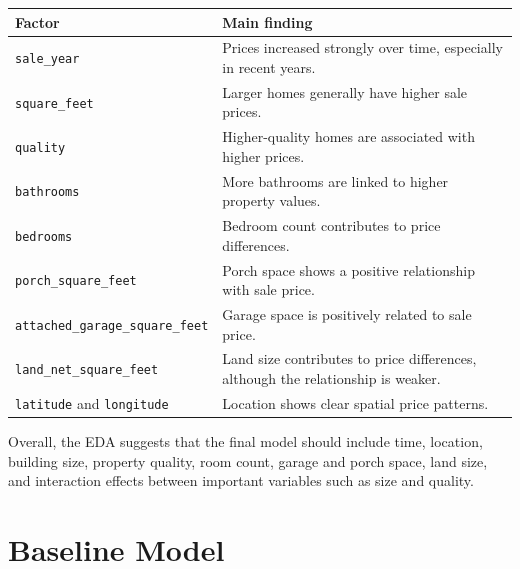 \documentclass[
  english,
  letterpaper,
  DIV=11,
  numbers=noendperiod]{scrreprt}
\begin{document}
\begin{longtable}[]{@{}
  >{\raggedright\arraybackslash}p{}
  >{\raggedright\arraybackslash}p{}@{}}
\toprule\noalign{}
\begin{minipage}[b]{\linewidth}\raggedright
Factor
\end{minipage} & \begin{minipage}[b]{\linewidth}\raggedright
Main finding
\end{minipage} \\
\midrule\noalign{}
\endhead
\bottomrule\noalign{}
\endlastfoot
\texttt{sale\_year} & Prices increased strongly over time, especially in
recent years. \\
\texttt{square\_feet} & Larger homes generally have higher sale
prices. \\
\texttt{quality} & Higher-quality homes are associated with higher
prices. \\
\texttt{bathrooms} & More bathrooms are linked to higher property
values. \\
\texttt{bedrooms} & Bedroom count contributes to price differences. \\
\texttt{porch\_square\_feet} & Porch space shows a positive relationship
with sale price. \\
\texttt{attached\_garage\_square\_feet} & Garage space is positively
related to sale price. \\
\texttt{land\_net\_square\_feet} & Land size contributes to price
differences, although the relationship is weaker. \\
\texttt{latitude} and \texttt{longitude} & Location shows clear spatial
price patterns. \\
\end{longtable}

Overall, the EDA suggests that the final model should include time,
location, building size, property quality, room count, garage and porch
space, land size, and interaction effects between important variables
such as size and quality.


\chapter{Baseline Model}\label{baseline-model}
\end{document}
